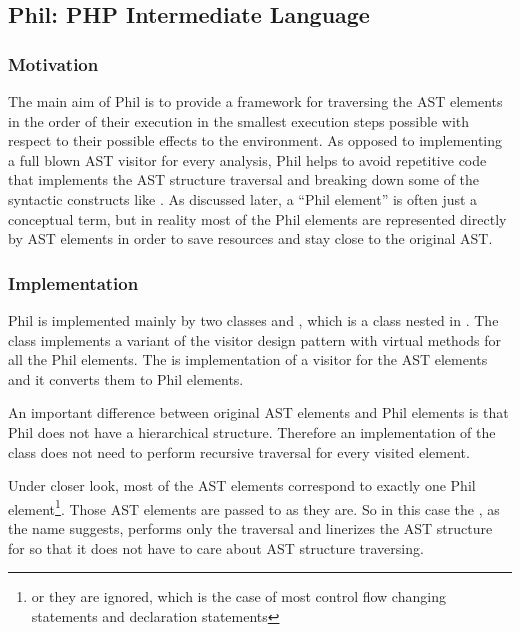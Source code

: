         \subsection{Phil: PHP Intermediate Language}
        
        \subsubsection*{Motivation}
        The main aim of Phil is to provide a framework for 
        traversing the AST elements in the order of their 
        execution in the smallest execution steps possible 
        with respect to their possible effects to the environment. 
        As opposed to implementing a full blown AST visitor 
        for every analysis, Phil helps to avoid repetitive 
        code that implements the AST structure traversal and 
        breaking down some of the syntactic constructs 
        like . As discussed later, a ``Phil element'' 
        is often just a conceptual term, but in reality most 
        of the Phil elements are represented directly by 
        AST elements in order to save resources and stay 
        close to the original AST.
        
        \subsubsection*{Implementation}
        Phil is implemented mainly by two classes  
        and , which is a class nested in . 
        The  class implements a variant of the visitor design pattern 
        with virtual  methods for all the Phil elements. 
        The  is implementation of a visitor for the 
        AST elements and it converts them to Phil elements.
        
        An important difference between original AST elements and 
        Phil elements is that Phil does not have a hierarchical structure. 
        Therefore an implementation of the  class does not 
        need to perform recursive traversal for every visited element.
        
        Under closer look, most of the AST elements correspond 
        to exactly one Phil element\footnote{or they are ignored, 
        which is the case of most control flow changing statements 
        and declaration statements}. 
        Those AST elements are passed to  as they are. 
        So in this case the , as the name suggests, 
        performs only the traversal and linerizes the AST structure 
        for  so that it does not have to 
        care about AST structure traversing.
        

